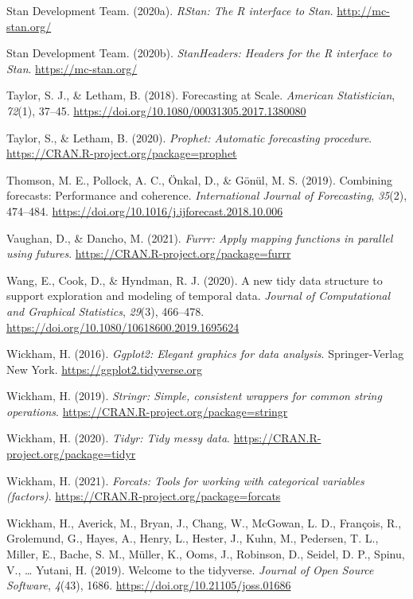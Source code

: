 \documentclass[
  english,
  man,floatsintext]{apa7}
\begin{document}
\leavevmode\hypertarget{ref-R-rstan}{}%
Stan Development Team. (2020a). \emph{RStan: The R interface to Stan}. \url{http://mc-stan.org/}

\leavevmode\hypertarget{ref-R-StanHeaders}{}%
Stan Development Team. (2020b). \emph{StanHeaders: Headers for the R interface to Stan}. \url{https://mc-stan.org/}

\leavevmode\hypertarget{ref-Taylor2018}{}%
Taylor, S. J., \& Letham, B. (2018). Forecasting at Scale. \emph{American Statistician}, \emph{72}(1), 37--45. \url{https://doi.org/10.1080/00031305.2017.1380080}

\leavevmode\hypertarget{ref-R-prophet}{}%
Taylor, S., \& Letham, B. (2020). \emph{Prophet: Automatic forecasting procedure}. \url{https://CRAN.R-project.org/package=prophet}

\leavevmode\hypertarget{ref-Thomson2019}{}%
Thomson, M. E., Pollock, A. C., Önkal, D., \& Gönül, M. S. (2019). Combining forecasts: Performance and coherence. \emph{International Journal of Forecasting}, \emph{35}(2), 474--484. \url{https://doi.org/10.1016/j.ijforecast.2018.10.006}

\leavevmode\hypertarget{ref-R-furrr}{}%
Vaughan, D., \& Dancho, M. (2021). \emph{Furrr: Apply mapping functions in parallel using futures}. \url{https://CRAN.R-project.org/package=furrr}

\leavevmode\hypertarget{ref-R-tsibble}{}%
Wang, E., Cook, D., \& Hyndman, R. J. (2020). A new tidy data structure to support exploration and modeling of temporal data. \emph{Journal of Computational and Graphical Statistics}, \emph{29}(3), 466--478. \url{https://doi.org/10.1080/10618600.2019.1695624}

\leavevmode\hypertarget{ref-R-ggplot2}{}%
Wickham, H. (2016). \emph{Ggplot2: Elegant graphics for data analysis}. Springer-Verlag New York. \url{https://ggplot2.tidyverse.org}

\leavevmode\hypertarget{ref-R-stringr}{}%
Wickham, H. (2019). \emph{Stringr: Simple, consistent wrappers for common string operations}. \url{https://CRAN.R-project.org/package=stringr}

\leavevmode\hypertarget{ref-R-tidyr}{}%
Wickham, H. (2020). \emph{Tidyr: Tidy messy data}. \url{https://CRAN.R-project.org/package=tidyr}

\leavevmode\hypertarget{ref-R-forcats}{}%
Wickham, H. (2021). \emph{Forcats: Tools for working with categorical variables (factors)}. \url{https://CRAN.R-project.org/package=forcats}

\leavevmode\hypertarget{ref-R-tidyverse}{}%
Wickham, H., Averick, M., Bryan, J., Chang, W., McGowan, L. D., François, R., Grolemund, G., Hayes, A., Henry, L., Hester, J., Kuhn, M., Pedersen, T. L., Miller, E., Bache, S. M., Müller, K., Ooms, J., Robinson, D., Seidel, D. P., Spinu, V., \ldots{} Yutani, H. (2019). Welcome to the tidyverse. \emph{Journal of Open Source Software}, \emph{4}(43), 1686. \url{https://doi.org/10.21105/joss.01686}
\end{document}
